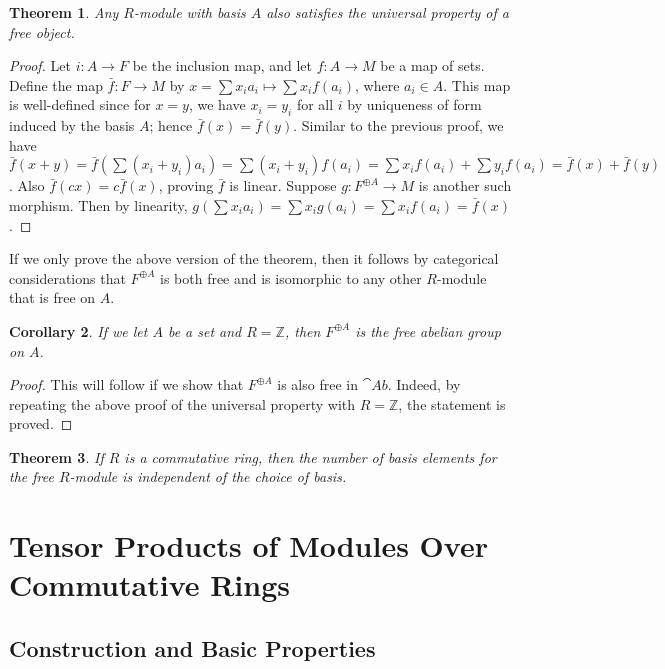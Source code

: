 \documentclass[12pt]{article}
\theoremstyle{definition}
\theoremstyle{plain}
\newtheorem{theorem}{Theorem}[section]
\newtheorem{corollary}[theorem]{Corollary}
\numberwithin{equation}{section}
\theoremstyle{definition}
\begin{document}
\begin{theorem}
Any $ R $-module with basis $ A $ also satisfies the universal property of a free object.
\end{theorem}

\begin{proof}
Let $ i : A \to F $ be the inclusion map, and let $ f : A \to M $ be a map of sets. Define the map $ \bar{f}: F \to M $ by $ x = \sum x_i a_i  \mapsto \sum x_i f(a_i)$, where $ a_i \in A $. This map is well-defined since for $ x = y $, we have $ x_i = y_i $ for all $ i $ by uniqueness of form induced by the basis $ A $; hence $ \bar{f}(x) = \bar{f}(y) $. Similar to the previous proof, we have $ \bar{f}(x + y) = \bar{f}(\sum (x_i + y_i) a_i) = \sum (x_i + y_i) f(a_i) = \sum x_i f(a_i) + \sum y_i f(a_i) = \bar{f}(x) + \bar{f}(y) $. Also $ \bar{f}(cx) = c \bar{f}(x) $, proving $ \bar{f} $ is linear. Suppose $ g : F^{\oplus A} \to M $ is another such morphism. Then by linearity, $ g(\sum x_i a_i) = \sum x_i g(a_i) = \sum x_i f(a_i) = \bar{f}(x) $.
\end{proof}

If we only prove the above version of the theorem, then it follows by categorical considerations that $ F^{\oplus A} $ is both free and is isomorphic to any other $ R $-module that is free on $ A $.


\begin{corollary}
If we let $ A $ be a set and $ R = \mathbb{Z} $, then $ F^{\oplus A} $ is the free abelian group on $ A $.
\end{corollary}

\begin{proof}
This will follow if we show that $ F^{\oplus A} $ is also free in $ \cat{Ab} $. Indeed, by repeating the above proof of the universal property with $ R = \mathbb{Z} $, the statement is proved.
\end{proof}

\begin{theorem}
If $ R $ is a commutative ring, then the number of basis elements for the free $ R $-module is independent of the choice of basis.
\end{theorem}

\section{Tensor Products of Modules Over Commutative Rings}

\subsection{Construction and Basic Properties}
\end{document}
